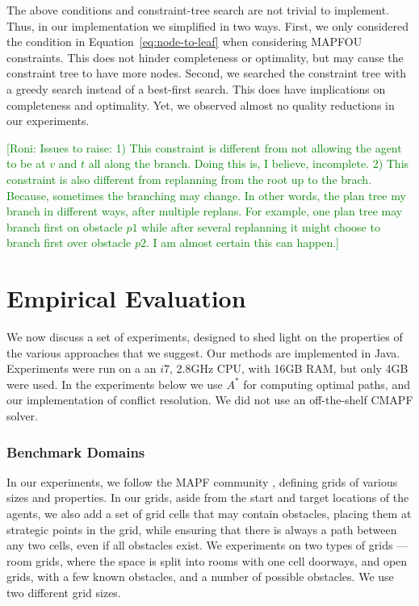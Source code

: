 \documentclass[letterpaper]{article} %
\newcommand{\roni}[1]{{\textcolor{green}{[Roni: #1]}}}
\begin{document}
The above conditions and constraint-tree search are not trivial to implement. 
Thus, in our implementation we simplified in two ways. 
First, we only considered the condition in Equation~\ref{eq:node-to-leaf} when considering MAPFOU constraints. This does not hinder completeness or optimality, but may cause the constraint tree to have more nodes. 
Second, we searched the constraint tree with a greedy search instead of a best-first search. 
This does have implications on completeness and optimality. 
Yet, we observed almost no quality reductions in our experiments. 


\roni{Issues to raise:
1) This constraint is different from not allowing the agent to be at $v$ and $t$ all along the branch. Doing this is, I believe, incomplete.
2) This constraint is also different from replanning from the root up to the brach. Because, sometimes the branching may change. In other words, the plan tree my branch in different ways, after multiple replans. For example, one plan tree may branch first on obstacle $p1$ while after several replanning it might choose to branch first over obstacle $p2$. I am almost certain this can happen.}

\section{Empirical Evaluation}

We now discuss a set of experiments, designed to shed light on the properties of the various approaches that we suggest. Our methods are implemented in Java. Experiments were run on a an $i7$, 2.8GHz CPU, with 16GB RAM, but only 4GB were used.
In the experiments below we use $A^*$ for computing optimal paths, and our implementation of conflict resolution. We did not use an off-the-shelf CMAPF solver.


\subsubsection{Benchmark Domains}

In our experiments, we follow the MAPF community \cite{stern2019multi}, defining grids of various sizes and properties. In our grids, aside from the start and target locations of the agents, we also add a set of grid cells that may contain obstacles, placing them at strategic points in the grid, while ensuring that there is always a path between any two cells, even if all obstacles exist.
We experiments on two types of grids --- room grids, where the space is split into rooms with one cell doorways, and open grids, with a few known obstacles, and a number of possible obstacles.
We use two different grid sizes. 
\end{document}
